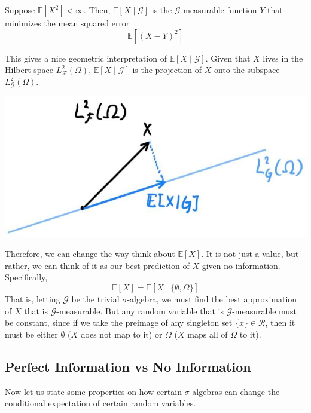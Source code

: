   \begin{theorem}
    Suppose $\mathbb{E}[X^2] < \infty$. Then, $\mathbb{E}[X \mid \mathcal{G}]$ is the $\mathcal{G}$-measurable function $Y$ that minimizes the mean squared error 
    \begin{equation}
      \mathbb{E}[ (X - Y)^2]
    \end{equation}
  \end{theorem}

  This gives a nice geometric interpretation of $\mathbb{E}[X \mid \mathcal{G}]$. Given that $X$ lives in the Hilbert space $L^2_\mathcal{F} (\Omega)$, $\mathbb{E}[X \mid \mathcal{G}]$ is the projection of $X$ onto the subspace $L^2_\mathcal{G} (\Omega)$. 
  \begin{center}
    \includegraphics[scale=0.3]{img/Hilbert_Space_projection.jpg}
  \end{center}
  Therefore, we can change the way think about $\mathbb{E}[X]$. It is not just a value, but rather, we can think of it as our best prediction of $X$ given no information. Specifically, 
  \begin{equation}
    \mathbb{E}[X] = \mathbb{E}[X \mid \{\emptyset, \Omega\}]
  \end{equation}
  That is, letting $\mathcal{G}$ be the trivial $\sigma$-algebra, we must find the best approximation of $X$ that is $\mathcal{G}$-measurable. But any random variable that is $\mathcal{G}$-measurable must be constant, since if we take the preimage of any singleton set $\{x\} \in \mathcal{R}$, then it must be either $\emptyset$ ($X$ does not map to it) or $\Omega$ ($X$ maps all of $\Omega$ to it).

\subsection{Perfect Information vs No Information}

  Now let us state some properties on how certain $\sigma$-algebras can change the conditional expectation of certain random variables. 

